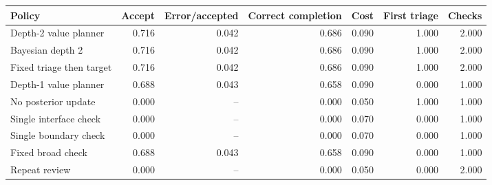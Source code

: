 \begin{tabular}{@{}lrrrrrr@{}}
\toprule
Policy & Accept & Error/accepted & Correct completion & Cost & First triage & Checks\\
\midrule
Depth-2 value planner & 0.716 & 0.042 & 0.686 & 0.090 & 1.000 & 2.000\\
Bayesian depth 2 & 0.716 & 0.042 & 0.686 & 0.090 & 1.000 & 2.000\\
Fixed triage then target & 0.716 & 0.042 & 0.686 & 0.090 & 1.000 & 2.000\\
Depth-1 value planner & 0.688 & 0.043 & 0.658 & 0.090 & 0.000 & 1.000\\
No posterior update & 0.000 & -- & 0.000 & 0.050 & 1.000 & 1.000\\
Single interface check & 0.000 & -- & 0.000 & 0.070 & 0.000 & 1.000\\
Single boundary check & 0.000 & -- & 0.000 & 0.070 & 0.000 & 1.000\\
Fixed broad check & 0.688 & 0.043 & 0.658 & 0.090 & 0.000 & 1.000\\
Repeat review & 0.000 & -- & 0.000 & 0.050 & 0.000 & 2.000\\
\bottomrule
\end{tabular}
